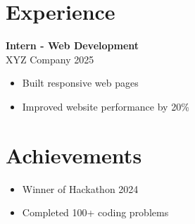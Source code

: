 \documentclass[a4paper,10pt]{article}
\begin{document}
\section*{Experience}
\textbf{Intern - Web Development} \\
XYZ Company \hfill 2025 \\
\begin{itemize}[noitemsep]
    \item Built responsive web pages
    \item Improved website performance by 20\%
\end{itemize}

\section*{Achievements}
\begin{itemize}[noitemsep]
    \item Winner of Hackathon 2024
    \item Completed 100+ coding problems
\end{itemize}
\end{document}
